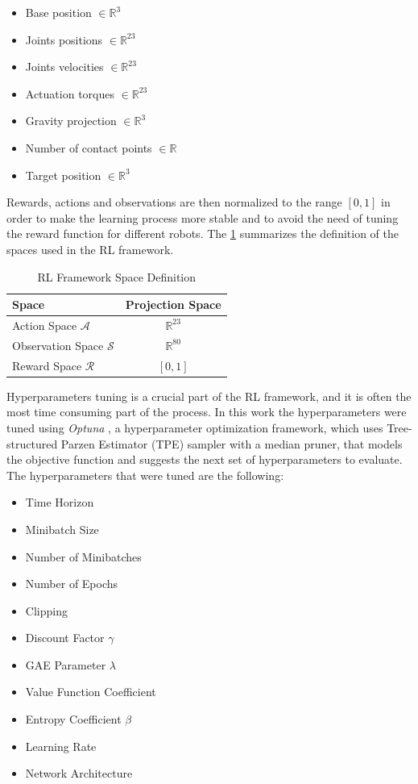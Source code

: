 \begin{itemize}
    \item Base position $\in \mathbb{R} ^{3}$
    \item Joints positions $\in \mathbb{R} ^{23}$
    \item Joints velocities $\in \mathbb{R} ^{23}$
    \item Actuation torques $\in \mathbb{R} ^{23}$
    \item Gravity projection $\in \mathbb{R} ^{3}$
    \item Number of contact points $\in \mathbb{R}$
    \item Target position $\in \mathbb{R} ^{3}$
\end{itemize}

Rewards, actions and observations are then normalized to the range $[0,1]$ in order to make the learning process more stable and to avoid the need of tuning the reward function for different robots. The \cref{tab:rlspacedef} summarizes the definition of the spaces used in the \ac{RL} framework.

\begin{table}
    \centering
    \begin{tabular}{l c}
        \toprule
        Space                           & Projection Space   \\
        \midrule
        Action Space $\mathcal{A}$      & $\mathbb{R} ^{23}$ \\
        Observation Space $\mathcal{S}$ & $\mathbb{R} ^{80}$ \\
        Reward Space $\mathcal{R}$      & $[0,1]$            \\
        \bottomrule
    \end{tabular}
    \caption{RL Framework Space Definition}
    \label{tab:rlspacedef}
\end{table}

Hyperparameters tuning is a crucial part of the \ac{RL} framework, and it is often the most time consuming part of the process. In this work the hyperparameters were tuned using \textit{Optuna} \cite{akiba_optuna_2019}, a hyperparameter optimization framework, which uses Tree-structured Parzen Estimator (\ac{TPE}) sampler with a median pruner, that models the objective function and suggests the next set of hyperparameters to evaluate. The hyperparameters that were tuned are the following:

\begin{itemize}
    \item Time Horizon
    \item Minibatch Size
    \item Number of Minibatches
    \item Number of Epochs
    \item Clipping
    \item Discount Factor $\gamma$
    \item GAE Parameter $\lambda$
    \item Value Function Coefficient
    \item Entropy Coefficient $\beta$
    \item Learning Rate
    \item Network Architecture
\end{itemize}

